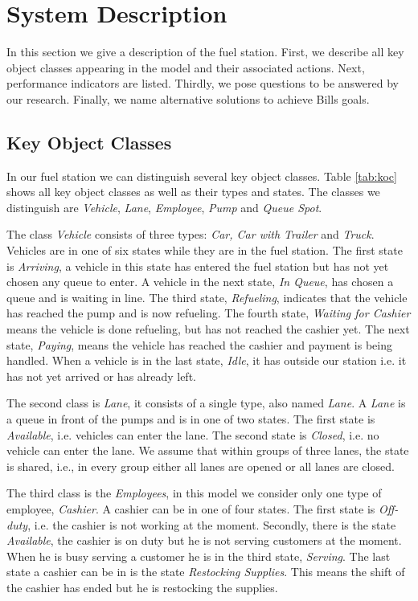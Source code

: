 \section{System Description}
In this section we give a description of the fuel station.
First, we describe all key object classes appearing in the model and their associated actions.
Next, performance indicators are listed.
Thirdly, we pose questions to be answered by our research.
Finally, we name alternative solutions to achieve Bills goals.

\subsection{Key Object Classes}
In our fuel station we can distinguish several key object classes.
Table \ref{tab:koc} shows all key object classes as well as their types and states.
The classes we distinguish are \textit{Vehicle}, \textit{Lane}, \textit{Employee}, \textit{Pump} and \textit{Queue Spot}.

The class \textit{Vehicle} consists of three types: \textit{Car, Car with Trailer} and \textit{Truck}.
 Vehicles are in one of six states while they are in the fuel station.
 The first state is \textit{Arriving}, a vehicle in this state has entered the fuel station but has not yet chosen any queue to enter.
 A vehicle in the next state, \textit{In Queue}, has chosen a queue and is waiting in line.
 The third state, \textit{Refueling}, indicates that the vehicle has reached the pump and is now refueling.
 The fourth state, \textit{Waiting for Cashier} means the vehicle is done refueling, but has not reached the cashier yet.
 The next state, \textit{Paying}, means the vehicle has reached the cashier and payment is being handled.
 When a vehicle is in the last state, \textit{Idle}, it has outside our station i.e. it has not yet arrived or has already left.

The second class is \textit{Lane}, it consists of a single type, also named \textit{Lane}.
A \textit{Lane} is a queue in front of the pumps and is in one of two states.
The first state is \textit{Available}, i.e. vehicles can enter the lane.
The second state is \textit{Closed}, i.e. no vehicle can enter the lane.
We assume that within groups of three lanes, the state is shared, i.e., in every group either all lanes are opened or all lanes are closed.

The third class is the \textit{Employees}, in this model we consider only one type of employee, \textit{Cashier}.
A cashier can be in one of four states.
The first state is \textit{Off-duty}, i.e. the cashier is not working at the moment.
Secondly, there is the state \textit{Available}, the cashier is on duty but he is not serving customers at the moment.
When he is busy serving a customer he is in the third state, \textit{Serving}.
The last state a cashier can be in is the state \textit{Restocking Supplies}.
This means the shift of the cashier has ended but he is restocking the supplies.

